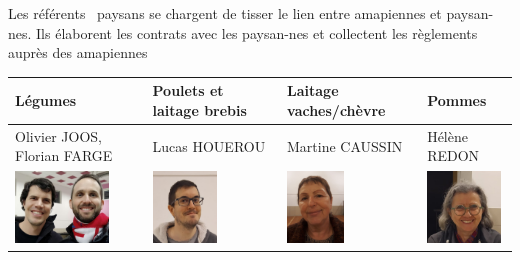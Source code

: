 \documentclass[10pt,a4paper,french]{article}
\begin{document}
\noindent Les référents \guillemotleft\ paysans \guillemotright se chargent de tisser le lien entre amapiennes et paysan-nes. Ils élaborent les contrats avec les paysan-nes et collectent les règlements auprès des amapiennes
\vspace{1em}
\begin{center}
  \begin{tabular}{ p{3.75cm}|p{3.75cm}|p{3.75cm}|p{3.75cm} }
    {\bf Légumes} & {\bf Poulets et laitage brebis} & {\bf Laitage vaches/chèvre} & {\bf Pommes} \\
    \hline\hline
    Olivier JOOS, Florian FARGE & Lucas HOUEROU & Martine CAUSSIN & Hélène REDON \\
    \includegraphics[height=1.9cm]{JOOS-FARGE.jpg} & \includegraphics[height=1.9cm]{HOUEROU.jpg} & \includegraphics[width=1.5cm]{CAUSSIN.jpg} & \includegraphics[height=1.9cm]{REDON.jpg}
  \end{tabular}
\end{center}
\vspace{1em}
\end{document}
